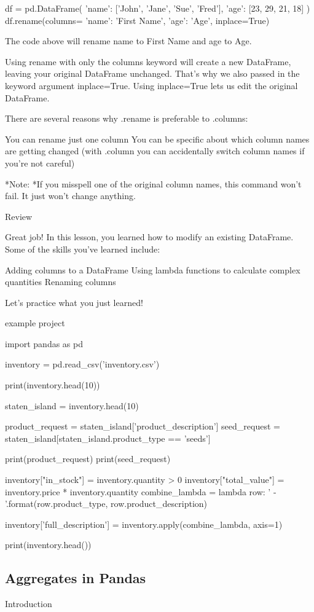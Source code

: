 \documentclass{journal}
\begin{document}
df = pd.DataFrame({
    'name': ['John', 'Jane', 'Sue', 'Fred'],
    'age': [23, 29, 21, 18]
})
df.rename(columns={
    'name': 'First Name',
    'age': 'Age'},
    inplace=True)

The code above will rename name to First Name and age to Age.

Using rename with only the columns keyword will create a new DataFrame, leaving your original DataFrame unchanged. That's why we also passed in the keyword argument inplace=True. Using inplace=True lets us edit the original DataFrame.

There are several reasons why .rename is preferable to .columns:

    You can rename just one column
    You can be specific about which column names are getting changed (with .column you can accidentally switch column names if you're not careful)

*Note: *If you misspell one of the original column names, this command won't fail. It just won't change anything.

Review

Great job! In this lesson, you learned how to modify an existing DataFrame. Some of the skills you've learned include:

    Adding columns to a DataFrame
    Using lambda functions to calculate complex quantities
    Renaming columns

Let's practice what you just learned!


example project

import pandas as pd

inventory = pd.read_csv('inventory.csv')

print(inventory.head(10))

staten_island = inventory.head(10)

product_request = staten_island['product_description']
seed_request = staten_island[staten_island.product_type == 'seeds']

print(product_request)
print(seed_request)

inventory["in_stock"] = inventory.quantity > 0
inventory["total_value"] = inventory.price * inventory.quantity
combine_lambda = lambda row: '{} - {}'.format(row.product_type, row.product_description)

inventory['full_description'] = inventory.apply(combine_lambda, axis=1)

print(inventory.head())

\subsection{Aggregates in Pandas}
Introduction
\end{document}
